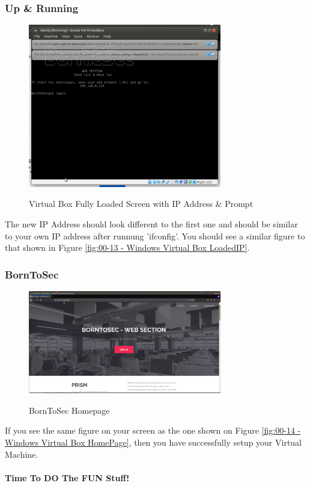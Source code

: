 \subsubsection{Up \& Running}

\begin{figure}[!htb]
    \centering
    \includegraphics[width=0.752\textwidth]{images/00-13.png}\\[0cm]  
    \caption[Virtual Box]{Virtual Box Fully Loaded Screen with IP Address \& Prompt}
    \label{fig:00-13 - Windows Virtual Box LoadedIP} 

\end{figure}
The new IP Address should look different to the first one and should be similar to
your own IP address after runnung 'ifconfig'.
You should see a similar figure to that shown in Figure \vref{fig:00-13 - Windows Virtual Box LoadedIP}.

\subsubsection{BornToSec}
\begin{figure}[!htb]
    \centering
    \includegraphics[width=0.752\textwidth]{images/00-14.png}\\[0cm]  
    \caption[Virtual Box]{BornToSec Homepage}
    \label{fig:00-14 - Windows Virtual Box HomePage} 
\end{figure}
If you see the same figure on your screen as the one shown on Figure \vref{fig:00-14 - Windows Virtual Box HomePage},
then you have successfully setup your Virtual Machine.

\paragraph{Time To DO The FUN Stuff!}

\clearpage
